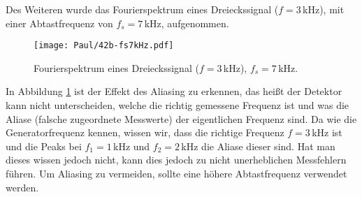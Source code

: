 \newpage
Des Weiteren wurde das Fourierspektrum eines Dreieckssignal ($f = 3$\,kHz), mit einer Abtastfrequenz von $f_s = 7$\,kHz, aufgenommen.
\begin{figure}[h]
    \centering
    \texttt{[image: Paul/42b-fs7kHz.pdf]}
    \caption{Fourierspektrum eines Dreieckssignal ($f = 3$\,kHz), $f_s = 7$\,kHz.}
    \label{fig:42a3}
\end{figure}

In Abbildung \ref{fig:42a3} ist der Effekt des Aliasing zu erkennen, das heißt der Detektor kann nicht unterscheiden, welche die richtig gemessene Frequenz ist und was die Aliase (falsche zugeordnete Messwerte) der eigentlichen Frequenz sind. Da wie die Generatorfrequenz kennen, wissen wir, dass die richtige Frequenz $f=3$\,kHz ist und die Peaks bei $f_1=1$\,kHz und $f_2=2$\,kHz die Aliase dieser sind. Hat man dieses wissen jedoch nicht, kann dies jedoch zu nicht unerheblichen Messfehlern führen. Um Aliasing zu vermeiden, sollte eine höhere Abtastfrequenz verwendet werden.